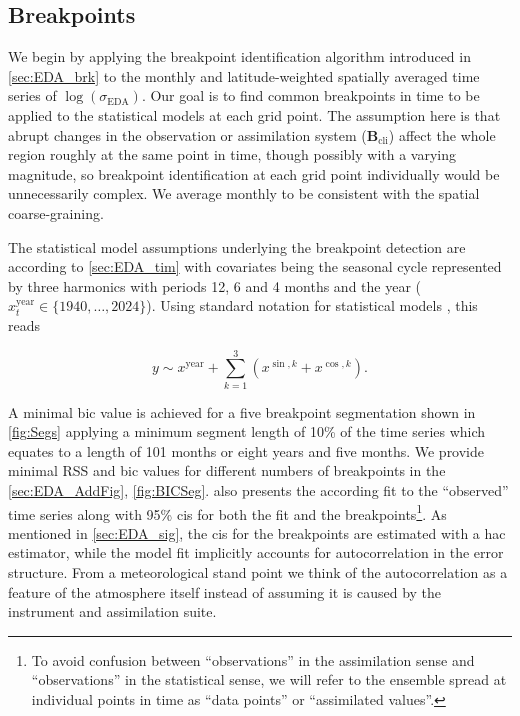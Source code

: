 \subsection{Breakpoints}\label{sec:EDA_resbrk}

We begin by applying the breakpoint identification algorithm introduced in \cref{sec:EDA_brk} to the monthly and latitude-weighted spatially averaged time series of $\log(\sigma_{\mathrm{EDA}})$. Our goal is to find common breakpoints in time to be applied to the statistical models at each grid point. The assumption here is that abrupt changes in the observation or assimilation system ($\mathbf{B}_{\mathrm{cli}}$) affect the whole region roughly at the same point in time, though possibly with a varying magnitude, so breakpoint identification at each grid point individually would be unnecessarily complex. We average monthly to be consistent with the spatial coarse-graining.

The statistical model assumptions underlying the breakpoint detection are according to \cref{sec:EDA_tim} with covariates being the seasonal cycle represented by three harmonics with periods 12, 6 and 4 months and the year ($x_t^{\text{year}} \in \{1940, \ldots , 2024\}$). Using standard notation for statistical models \parencite{pinheiroMixedeffectsModelsSPLUS2000}, this reads

\begin{equation}\label{eq:InstrMod}
    y\sim x^{\text{year}} + \sum_{k=1}^{3} \left(x^{\sin, k} + x^{\cos, k} \right).
\end{equation}

A minimal \gls{bic} value is achieved for a five breakpoint segmentation shown in \cref{fig:Segs} applying a minimum segment length of 10\% of the time series which equates to a length of 101 months or eight years and five months. We provide minimal RSS and \gls{bic} values for different numbers of breakpoints in the \cref{sec:EDA_AddFig}, \cref{fig:BICSeg}.  also presents the according fit to the \enquote{observed} time series along with 95\% \glspl{ci} for both the fit and the breakpoints\footnote{To avoid confusion between \enquote{observations} in the assimilation sense and \enquote{observations} in the statistical sense, we will refer to the ensemble spread at individual points in time as \enquote{data points} or \enquote{assimilated values}.}. As mentioned in \cref{sec:EDA_sig}, the \glspl{ci} for the breakpoints are estimated with a \gls{hac} estimator, while the model fit implicitly accounts for autocorrelation in the error structure. From a meteorological stand point we think of the autocorrelation as a feature of the atmosphere itself instead of assuming it is caused by the instrument and assimilation suite.


